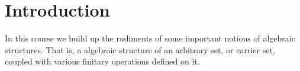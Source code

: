 
\section{Introduction} %
\label{sec:introduction}
In this course we build up the rudiments of some important notions of algebraic structures.
That is, a algebraic structure of an arbitrary set, or carrier set, coupled with various finitary operations defined on it.
